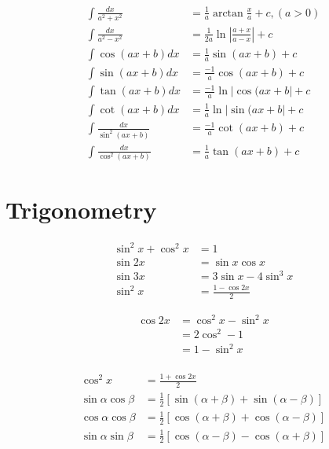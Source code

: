 \documentclass[a4paper, 11pt]{book}
\begin{document}
\begin{multicols}{2}
\begin{align}
            \int{\frac{dx}{a^{2}+x^{2}}} &= \frac{1}{a}\arctan{\frac{x}{a}}+c, (a>0)\\
            \int{\frac{dx}{a^{2}-x^{2}}} &= \frac{1}{2a}\ln{\left|\frac{a+x}{a-x}\right|}+c\\
            \int{\cos{(ax+b)}}dx &= \frac{1}{a}\sin{(ax+b)}+c\\
            \int{\sin{(ax+b)}}dx &= \frac{-1}{a}\cos{(ax+b)}+c\\
            \int{\tan{(ax+b)}}dx &= \frac{-1}{a}\ln{|\cos{(ax+b}|}+c\\
            \int{\cot{(ax+b)}}dx &= \frac{1}{a}\ln{|\sin{(ax+b}|}+c\\
            \int{\frac{dx}{\sin^{2}{(ax+b)}}} &= \frac{-1}{a}\cot{(ax+b)}+c\\
            \int{\frac{dx}{\cos^{2}{(ax+b)}}} &= \frac{1}{a}\tan{(ax+b)}+c
        \end{align}
    \end{multicols}

    \chapter{Trigonometry}

    \begin{multicols}{2}  
        
        \begin{align}
            \sin^{2}{x}+\cos^{2}{x}&=1\\
            \sin{2x} &= \sin{x}\cos{x}\\
            \sin{3x} &= 3\sin{x}-4\sin^{3}{x}\\
            \sin^{2}{x} &= \frac{1-\cos{2x}}{2}
        \end{align}

        \begin{equation}
            \begin{split}
                \cos{2x} &= \cos^{2}{x}-\sin^{2}{x}\\
                        &= 2\cos^{2}-1\\
                        &= 1-\sin^{2}{x}\\
            \end{split}
        \end{equation}

        \begin{align}
            \cos^{2}{x} &= \frac{1+\cos{2x}}{2}\\
            \sin{\alpha}\cos{\beta} &= \frac{1}{2}[\sin{(\alpha+\beta)}+\sin{(\alpha-\beta)}]\\
            \cos{\alpha}\cos{\beta} &= \frac{1}{2}[\cos{(\alpha+\beta)}+\cos{(\alpha-\beta)}]\\
            \sin{\alpha}\sin{\beta} &= \frac{1}{2}[\cos{(\alpha-\beta)}-\cos{(\alpha+\beta)}]
        \end{align}

    \end{multicols}
\end{document}
